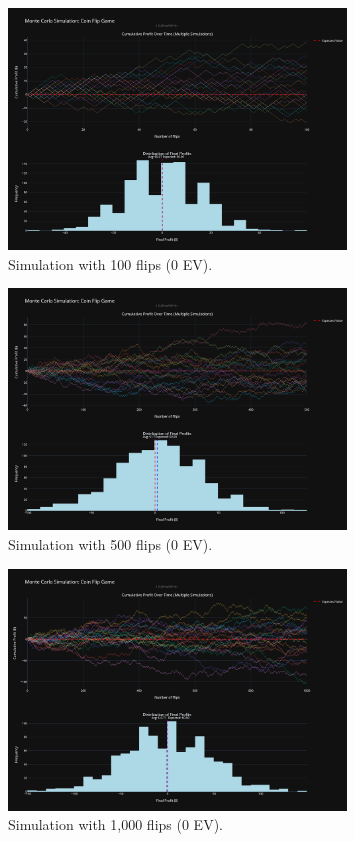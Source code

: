 \documentclass[12pt]{article}
\begin{document}
\begin{figure}[h!]
\centering
\includegraphics[width=0.8\textwidth]{nev/100nev.png}
\caption{Simulation with 100 flips (0 EV).}
\end{figure}
\clearpage

\begin{figure}[h!]
\centering
\includegraphics[width=0.8\textwidth]{nev/500nev.png}
\caption{Simulation with 500 flips (0 EV).}
\end{figure}

\begin{figure}[h!]
\centering
\includegraphics[width=0.8\textwidth]{nev/1000nev.png}
\caption{Simulation with 1,000 flips (0 EV).}
\end{figure}
\clearpage
\end{document}
